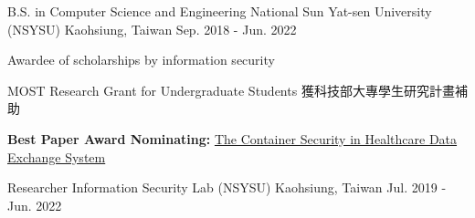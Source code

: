 

\begin{cventries}

  \cventry
  {B.S. in Computer Science and Engineering} %
  {National Sun Yat-sen University (NSYSU)} %
  {Kaohsiung, Taiwan} %
  {Sep. 2018 - Jun. 2022} %
  {
    \begin{cvitems} %
      \item {Awardee of scholarships by information security}
      \item {MOST Research Grant for Undergraduate Students 獲科技部大專學生研究計畫補助}
      \item {\textbf{Best Paper Award Nominating:} \href{https://github.com/25077667/Container_Security}{The Container Security in Healthcare Data Exchange System}}
    \end{cvitems}
  }

  \cventry
  {Researcher}
  {Information Security Lab (NSYSU)}
  {Kaohsiung, Taiwan} %
  {Jul. 2019 - Jun. 2022} %
  {}

\end{cventries}
